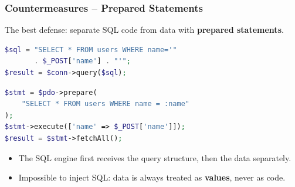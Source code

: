 \documentclass{beamer}
\begin{document}
\begin{frame}[fragile]
\frametitle{Countermeasures -- Prepared Statements}

The \alert{best defense}: separate SQL code from data with \textbf{prepared statements}.

\begin{lstlisting}[language=PHP,title={\texttt{BEFORE -- Vulnerable (concatenation)}}]
$sql = "SELECT * FROM users WHERE name='"
       . $_POST['name'] . "'";
$result = $conn->query($sql);
\end{lstlisting}

\begin{lstlisting}[language=PHP,title={\texttt{AFTER -- Secure (PDO prepared statement)}}]
$stmt = $pdo->prepare(
    "SELECT * FROM users WHERE name = :name"
);
$stmt->execute(['name' => $_POST['name']]);
$result = $stmt->fetchAll();
\end{lstlisting}

\begin{itemize}
\item The SQL engine first receives the query \alert{structure}, then the \alert{data} separately.
\item Impossible to inject SQL: data is always treated as \textbf{values}, never as code.
\end{itemize}
\end{frame}
\end{document}
